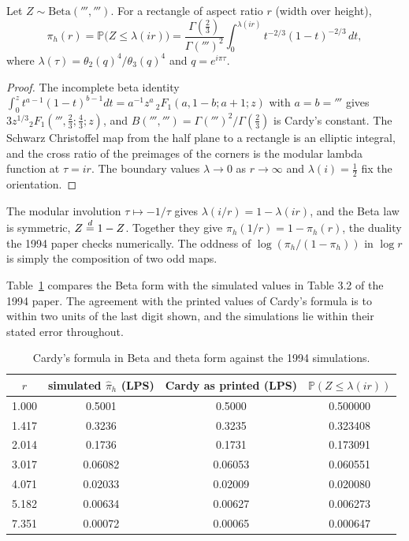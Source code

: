 \begin{proposition}\label{perc:prop:beta}
Let $Z\sim\mathrm{Beta}(\third,\third)$. For a rectangle of aspect ratio $r$ (width over height),
\[
\pi_h(r) = \mathbb{P}\big(Z\le\lambda(ir)\big) = \frac{\Gamma(\tfrac23)}{\Gamma(\third)^2}\int_0^{\lambda(ir)}t^{-2/3}(1-t)^{-2/3}\,dt,
\]
where $\lambda(\tau) = \theta_2(q)^4/\theta_3(q)^4$ and $q = e^{i\pi\tau}$.
\end{proposition}
\begin{proof}
The incomplete beta identity $\int_0^z t^{a-1}(1-t)^{b-1}dt = a^{-1}z^a\,{}_2F_1(a,1-b;a+1;z)$ with $a=b=\third$ gives $3z^{1/3}{}_2F_1(\third,\tfrac23;\tfrac43;z)$, and $B(\third,\third) = \Gamma(\third)^2/\Gamma(\tfrac23)$ is Cardy's constant. The Schwarz Christoffel map from the half plane to a rectangle is an elliptic integral, and the cross ratio of the preimages of the corners is the modular lambda function at $\tau = ir$. The boundary values $\lambda\to0$ as $r\to\infty$ and $\lambda(i) = \tfrac12$ fix the orientation.
\end{proof}

\begin{remark}
The modular involution $\tau\mapsto-1/\tau$ gives $\lambda(i/r) = 1-\lambda(ir)$, and the Beta law is symmetric, $Z\overset{d}{=}1-Z$. Together they give $\pi_h(1/r) = 1-\pi_h(r)$, the duality the 1994 paper checks numerically. The oddness of $\log(\pi_h/(1-\pi_h))$ in $\log r$ is simply the composition of two odd maps.
\end{remark}

Table~\ref{perc:tab:cardy} compares the Beta form with the simulated values in Table 3.2 of the 1994 paper. The agreement with the printed values of Cardy's formula is to within two units of the last digit shown, and the simulations lie within their stated error throughout.

\begin{table}[h]
\centering
\begin{tabular}{cccc}
\toprule
$r$ & simulated $\hat\pi_h$ (LPS) & Cardy as printed (LPS) & $\mathbb{P}(Z\le\lambda(ir))$ \\
\midrule
1.000 & 0.5001 & 0.5000 & 0.500000 \\
1.417 & 0.3236 & 0.3235 & 0.323408 \\
2.014 & 0.1736 & 0.1731 & 0.173091 \\
3.017 & 0.06082 & 0.06053 & 0.060551 \\
4.071 & 0.02033 & 0.02009 & 0.020080 \\
5.182 & 0.00634 & 0.00627 & 0.006273 \\
7.351 & 0.00072 & 0.00065 & 0.000647 \\
\bottomrule
\end{tabular}
\caption{Cardy's formula in Beta and theta form against the 1994 simulations.}
\label{perc:tab:cardy}
\end{table}

